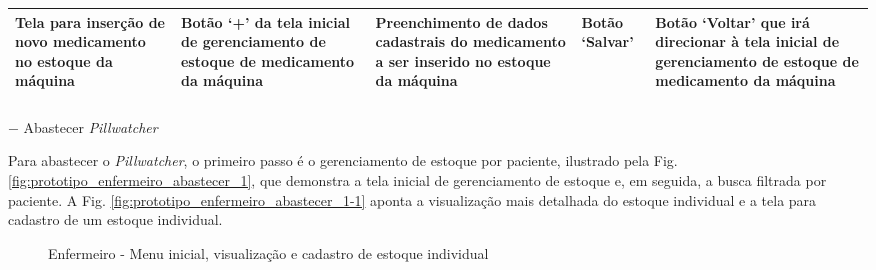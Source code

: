\begin{table}[H]
\begin{adjustbox}{max width = \textwidth}
\begin{tabular}{|L{5cm}|L{4cm}|L{6cm}|L{4cm}|L{4cm}|}
            \hline
            Tela para inserção de novo medicamento no estoque da máquina & Botão `+' da tela inicial de gerenciamento de estoque de medicamento da máquina & Preenchimento de dados cadastrais do medicamento a ser inserido no estoque da máquina & Botão `Salvar' & Botão `Voltar' que irá direcionar à tela inicial de gerenciamento de estoque de medicamento da máquina \\ 
            \hline
        \end{tabular}
    \end{adjustbox}
\end{table}

\subparagraph*{} $-$ Abastecer \textit{Pillwatcher}

Para abastecer o \textit{Pillwatcher}, o primeiro passo é o gerenciamento de estoque por paciente, ilustrado pela Fig. \ref{fig:prototipo_enfermeiro_abastecer_1}, que demonstra a tela inicial de gerenciamento de estoque e, em seguida, a busca filtrada por paciente. A Fig. \ref{fig:prototipo_enfermeiro_abastecer_1-1} aponta a visualização mais detalhada do estoque individual e a tela para cadastro de um estoque individual. 

\begin{figure}[H]
    \centering
 	\hspace{0.1cm}
    \caption{Enfermeiro - Menu inicial, visualização e cadastro de estoque individual}
\end{figure}

